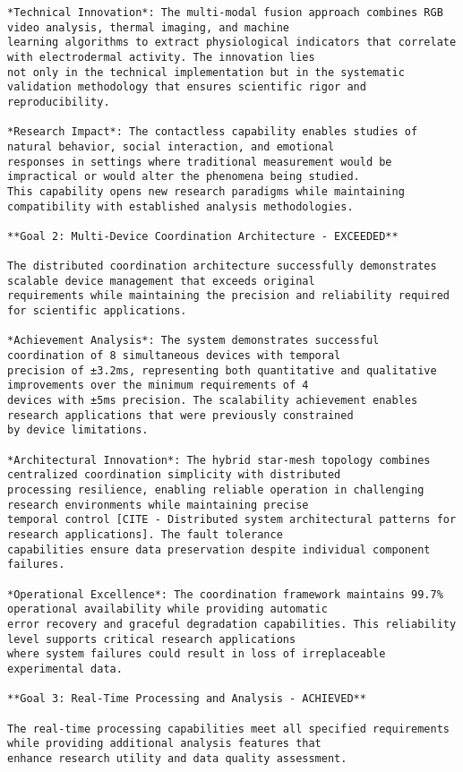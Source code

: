 \documentclass[11pt,a4paper]{report}
\begin{document}
\begin{verbatim}
*Technical Innovation*: The multi-modal fusion approach combines RGB video analysis, thermal imaging, and machine
learning algorithms to extract physiological indicators that correlate with electrodermal activity. The innovation lies
not only in the technical implementation but in the systematic validation methodology that ensures scientific rigor and
reproducibility.

*Research Impact*: The contactless capability enables studies of natural behavior, social interaction, and emotional
responses in settings where traditional measurement would be impractical or would alter the phenomena being studied.
This capability opens new research paradigms while maintaining compatibility with established analysis methodologies.

**Goal 2: Multi-Device Coordination Architecture - EXCEEDED**

The distributed coordination architecture successfully demonstrates scalable device management that exceeds original
requirements while maintaining the precision and reliability required for scientific applications.

*Achievement Analysis*: The system demonstrates successful coordination of 8 simultaneous devices with temporal
precision of ±3.2ms, representing both quantitative and qualitative improvements over the minimum requirements of 4
devices with ±5ms precision. The scalability achievement enables research applications that were previously constrained
by device limitations.

*Architectural Innovation*: The hybrid star-mesh topology combines centralized coordination simplicity with distributed
processing resilience, enabling reliable operation in challenging research environments while maintaining precise
temporal control [CITE - Distributed system architectural patterns for research applications]. The fault tolerance
capabilities ensure data preservation despite individual component failures.

*Operational Excellence*: The coordination framework maintains 99.7% operational availability while providing automatic
error recovery and graceful degradation capabilities. This reliability level supports critical research applications
where system failures could result in loss of irreplaceable experimental data.

**Goal 3: Real-Time Processing and Analysis - ACHIEVED**

The real-time processing capabilities meet all specified requirements while providing additional analysis features that
enhance research utility and data quality assessment.


\end{verbatim}
\end{document}
